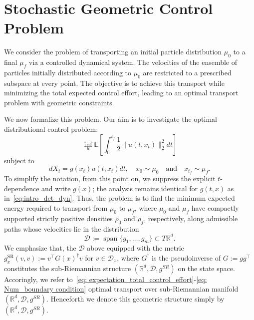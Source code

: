 \documentclass{amsart}
\numberwithin{equation}{section}
\newcommand{\R}{\mathbb{R}}
\newcommand{\E}{\mathbb{E}}
\begin{document}
\section{Stochastic Geometric Control Problem}\label{sec: Stochastic Geometric Control Problem}
We consider the problem of transporting an initial particle distribution $\mu_0$ to a final $\mu_f$ via a controlled dynamical system. The velocities of the ensemble of particles initially distributed according to $\mu_0$ are restricted to a prescribed subspace at every point. The objective is to achieve this transport while minimizing the total expected control effort, leading to an optimal transport problem with geometric constraints.

We now formalize this problem. Our aim is to investigate the optimal distributional control problem:
\begin{equation}\label{eq: expectation_total_control_effort}
\inf_{u} \E \left[ \int_0^{t_f} \frac12 \|u(t,  x_t)\|_2^2  dt\right]
\end{equation}
subject to
\begin{equation}\label{eq: Num_boundary condition}
dX_t=g(x_t)u(t,x_t)dt,\quad x_0\sim\mu_0\quad\text{and}\quad x_{t_f}\sim\mu_f.
\end{equation}
To simplify the notation, from this point on, we suppress the explicit $t$-dependence and write $g(x)$; the analysis remains identical for $g(t,x)$ as in~\eqref{eq:intro_det_dyn}. Thus, the problem is to find the minimum expected energy required to transport from  $\mu_0$  to  $\mu_f$, where $\mu_0$ and $\mu_f$ have compactly supported strictly positive densities $\rho_0$ and $\rho_f$, respectively, along admissible paths whose velocities lie in the distribution%
\begin{equation}\label{eq: distribution}
\mathcal{D} := \operatorname{span}\{g_1, \dots, g_m\} \subset T\mathbb{R}^d.
\end{equation}
We emphasize that, the $\mathcal{D}$ above equipped with the metric  $g_x^{\text{SR}}(v,v) := v^\top G(x)^\dagger v$ for $v \in \mathcal{D}_{x}$, where $G^\dagger$ is the pseudoinverse of $G := g g^\top$ constitutes the sub-Riemannian structure $(\R^d,\mathcal{D},g^{SR})$ on the state space. Accoringly, we refer to~\eqref{eq: expectation_total_control_effort}-\eqref{eq: Num_boundary condition} optimal transport over sub-Riemannian manifold $(\R^d,\mathcal{D},g^{SR})$. Henceforth we denote this geometric structure simply by $(\R^d,\mathcal{D},g^{SR})$.
\end{document}
